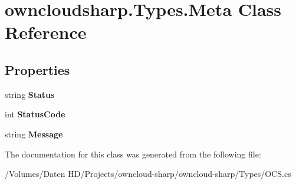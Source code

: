 \hypertarget{classowncloudsharp_1_1_types_1_1_meta}{}\section{owncloudsharp.\+Types.\+Meta Class Reference}
\label{classowncloudsharp_1_1_types_1_1_meta}
\subsection*{Properties}
\begin{DoxyCompactItemize}
\item 
\hypertarget{classowncloudsharp_1_1_types_1_1_meta_acdc52e0c7e0df65d17a7247e1527f518}{}string {\bfseries Status}\label{classowncloudsharp_1_1_types_1_1_meta_acdc52e0c7e0df65d17a7247e1527f518}

\item 
\hypertarget{classowncloudsharp_1_1_types_1_1_meta_a8322438609748cc7c0fca4984daf39c2}{}int {\bfseries Status\+Code}\label{classowncloudsharp_1_1_types_1_1_meta_a8322438609748cc7c0fca4984daf39c2}

\item 
\hypertarget{classowncloudsharp_1_1_types_1_1_meta_a2dcb4b0826692240c02ee824cd84b62b}{}string {\bfseries Message}\label{classowncloudsharp_1_1_types_1_1_meta_a2dcb4b0826692240c02ee824cd84b62b}

\end{DoxyCompactItemize}


The documentation for this class was generated from the following file\+:\begin{DoxyCompactItemize}
\item 
/\+Volumes/\+Daten H\+D/\+Projects/owncloud-\/sharp/owncloud-\/sharp/\+Types/O\+C\+S.\+cs\end{DoxyCompactItemize}
